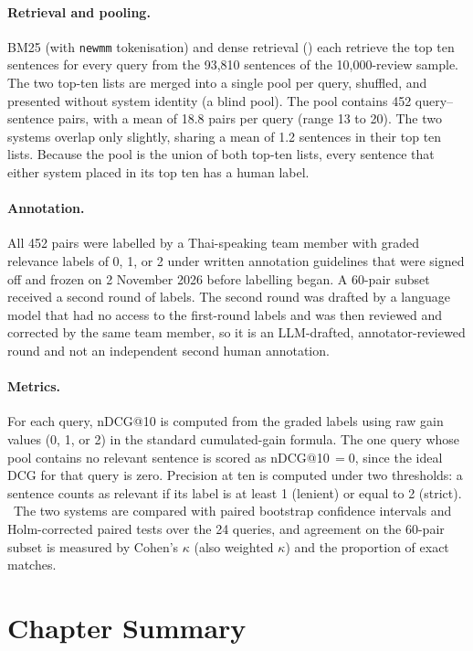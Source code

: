 \paragraph{Retrieval and pooling.} BM25 (with \texttt{newmm} tokenisation) and dense retrieval (\mpnet{}) each retrieve the top ten sentences for every query from the 93,810 sentences of the 10,000-review sample. The two top-ten lists are merged into a single pool per query, shuffled, and presented without system identity (a blind pool). The pool contains 452 query--sentence pairs, with a mean of 18.8 pairs per query (range 13 to 20). The two systems overlap only slightly, sharing a mean of 1.2 sentences in their top ten lists. Because the pool is the union of both top-ten lists, every sentence that either system placed in its top ten has a human label.

\paragraph{Annotation.} All 452 pairs were labelled by a Thai-speaking team member with graded relevance labels of 0, 1, or 2 under written annotation guidelines that were signed off and frozen on 2 November 2026 before labelling began. A 60-pair subset received a second round of labels. The second round was drafted by a language model that had no access to the first-round labels and was then reviewed and corrected by the same team member, so it is an LLM-drafted, annotator-reviewed round and not an independent second human annotation.

\paragraph{Metrics.} For each query, nDCG@10 is computed from the graded labels using raw gain values (0, 1, or 2) in the standard cumulated-gain formula. The one query whose pool contains no relevant sentence is scored as nDCG@10\,$= 0$, since the ideal DCG for that query is zero. Precision at ten is computed under two thresholds: a sentence counts as relevant if its label is at least 1 (lenient) or equal to 2 (strict).
\ The two systems are compared with paired bootstrap confidence intervals and Holm-corrected paired tests over the 24 queries, and agreement on the 60-pair subset is measured by Cohen's $\kappa$ (also weighted $\kappa$) and the proportion of exact matches.

\section{Chapter Summary}
\label{sec:methodsummary}

